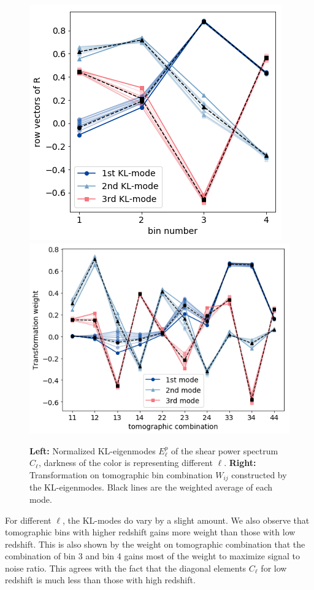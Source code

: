 \documentclass[twocolumn]{\docclass}
\begin{document}
	\begin{figure}
		\includegraphics[width=0.80\columnwidth]{epi.png}
		\includegraphics[width=1.02\columnwidth]{Wij.png}
		\caption{\textbf{Left:} Normalized KL-eigenmodes $E_\ell^p$ of the shear power spectrum $C_{\ell}$, darkness of the color is representing different $\ell$. \textbf{Right:} Transformation on tomographic bin combination $W_{ij}$ constructed by the KL-eigenmodes. Black lines are the weighted average of each mode. \label{fig:kl-mode}}
	\end{figure}
	
	For different $\ell$, the KL-modes do vary by a slight amount. We also observe that tomographic bins with higher redshift gains more weight than those with low redshift. This is also shown by the weight on tomographic combination that the combination of bin 3 and bin 4 gains most of the weight to maximize signal to noise ratio. This agrees with the fact that the diagonal elements $C_\ell$ for low redshift is much less than those with high redshift. 
	
\end{document}
